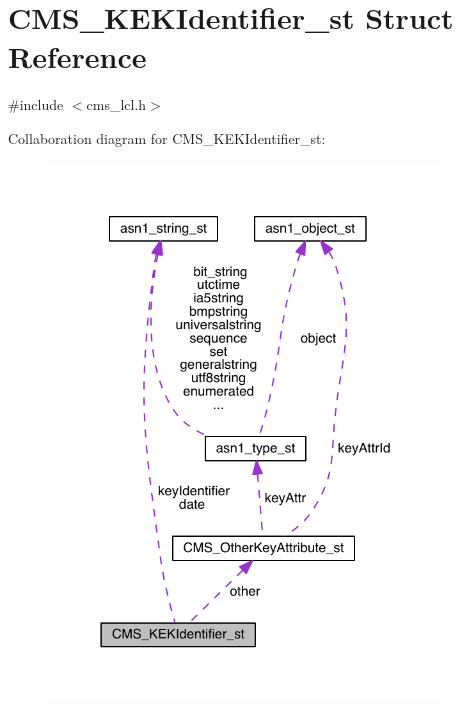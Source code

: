 \hypertarget{struct_c_m_s___k_e_k_identifier__st}{}\section{C\+M\+S\+\_\+\+K\+E\+K\+Identifier\+\_\+st Struct Reference}
\label{struct_c_m_s___k_e_k_identifier__st}


{\ttfamily \#include $<$cms\+\_\+lcl.\+h$>$}



Collaboration diagram for C\+M\+S\+\_\+\+K\+E\+K\+Identifier\+\_\+st\+:\nopagebreak
\begin{figure}[H]
\begin{center}
\leavevmode
\includegraphics[width=297pt]{struct_c_m_s___k_e_k_identifier__st__coll__graph}
\end{center}
\end{figure}
